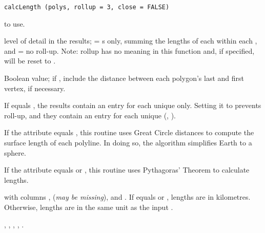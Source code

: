\documentclass[letterpaper]{book}
\begin{document}
%
\begin{Usage}
\begin{verbatim}
calcLength (polys, rollup = 3, close = FALSE)
\end{verbatim}
\end{Usage}
%
\begin{Arguments}
\begin{ldescription}
\item[\code{polys}]  to use.
\item[\code{rollup}] level of detail in the results;  = s
only, summing the lengths of each  within each ,
and  = no roll-up. Note: rollup  has no meaning in
this function and, if specified, will be reset to .
\item[\code{close}] Boolean value; if , include the distance
between each polygon's last and first vertex, if necessary.
\end{ldescription}
\end{Arguments}
%
\begin{Details}\relax
If  equals , the results contain an entry for
each unique  only.  Setting it to  prevents roll-up,
and they contain an entry for each unique (, ).

If the  attribute equals , this routine uses
Great Circle distances to compute the surface length of each polyline.
In doing so, the algorithm simplifies Earth to a sphere.

If the  attribute equals  or , this
routine uses Pythagoras' Theorem to calculate lengths.
\end{Details}
%
\begin{Value}
 with columns ,  (\emph{may be missing}),
and .  If  equals  or
, lengths are in kilometres.  Otherwise, lengths are in the
same unit as the input .
\end{Value}
%
\begin{SeeAlso}\relax
{},
,
,
,
.
\end{SeeAlso}
%
\begin{Examples}
\end{Examples}
\end{document}
